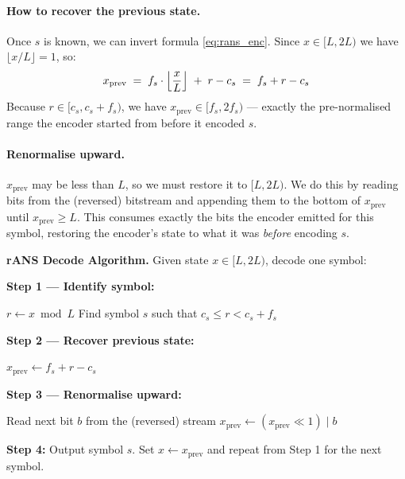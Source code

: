 \paragraph{How to recover the previous state.}
Once $s$ is known, we can invert formula \eqref{eq:rans_enc}.
Since $x \in [L, 2L)$ we have $\lfloor x/L \rfloor = 1$, so:
\[
  x_{\text{prev}} \;=\; f_s \cdot \Bigl\lfloor \frac{x}{L} \Bigr\rfloor
                  \;+\; r - c_s
                  \;=\; f_s + r - c_s
\]
Because $r \in [c_s, c_s + f_s)$, we have
$x_{\text{prev}} \in [f_s, 2f_s)$ — exactly the
pre-normalised range the encoder started from before it
encoded $s$.

\paragraph{Renormalise upward.}
$x_{\text{prev}}$ may be less than $L$, so we must restore it
to $[L, 2L)$.  We do this by reading bits from the (reversed)
bitstream and appending them to the bottom of $x_{\text{prev}}$
until $x_{\text{prev}} \ge L$.  This consumes exactly the bits
the encoder emitted for this symbol, restoring the encoder's
state to what it was \emph{before} encoding $s$.

\begin{definitionbox}
\textbf{rANS Decode Algorithm.}  Given state
$x \in [L, 2L)$, decode one symbol:

\medskip
\textbf{Step 1 — Identify symbol:}
\begin{algorithmic}[1]
\State $r \leftarrow x \bmod L$
\State Find symbol $s$ such that $c_s \le r < c_s + f_s$
\end{algorithmic}

\medskip
\textbf{Step 2 — Recover previous state:}
\begin{algorithmic}[1]
\State $x_{\text{prev}} \leftarrow f_s + r - c_s$
\end{algorithmic}

\medskip
\textbf{Step 3 — Renormalise upward:}
\begin{algorithmic}[1]
    \State Read next bit $b$ from the (reversed) stream
    \State $x_{\text{prev}} \leftarrow (x_{\text{prev}} \ll 1) \mid b$
\EndWhile
{}
\end{algorithmic}

\medskip
\textbf{Step 4:} Output symbol $s$.  Set $x \leftarrow x_{\text{prev}}$
and repeat from Step 1 for the next symbol.
\end{definitionbox}

